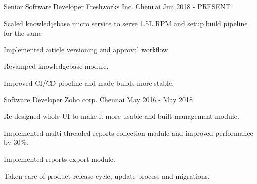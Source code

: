 
\begin{cventries}
  \cventry
    {Senior Software Developer} %
    {Freshworks Inc.} %
    {Chennai} %
    {Jun 2018 - PRESENT} %
    {
      \begin{cvitems} %
        \item {Scaled knowledgebase micro service to serve 1.5L RPM and setup build pipeline for the same}
        \item {Implemented article versioning and approval workflow.}
        \item {Revamped knowledgebase module.}
        \item {Improved CI/CD pipeline and made builds more stable.}
      \end{cvitems}
    }

  \cventry
    {Software Developer} %
    {Zoho corp.} %
    {Chennai} %
    {May 2016 - May 2018} %
    {
      \begin{cvitems} %
        \item {Re-designed whole UI to make it more usable and built management module.}
        \item {Implemented multi-threaded reports collection module and improved performance by 30\%.}
        \item {Implemented reports export module.}
        \item {Taken care of product release cycle, update process and migrations.}
      \end{cvitems}
    }    
\end{cventries}
